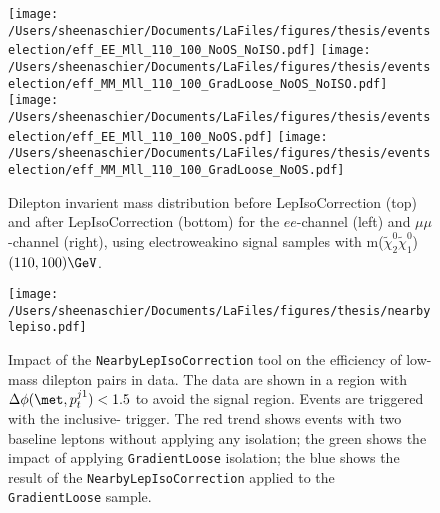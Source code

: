   \begin{figure}[tbp]
     \texttt{[image: /Users/sheenaschier/Documents/LaFiles/figures/thesis/eventselection/eff\_EE\_Mll\_110\_100\_NoOS\_NoISO.pdf]}
       \texttt{[image: /Users/sheenaschier/Documents/LaFiles/figures/thesis/eventselection/eff\_MM\_Mll\_110\_100\_GradLoose\_NoOS\_NoISO.pdf]}\\
     \texttt{[image: /Users/sheenaschier/Documents/LaFiles/figures/thesis/eventselection/eff\_EE\_Mll\_110\_100\_NoOS.pdf]}
     \texttt{[image: /Users/sheenaschier/Documents/LaFiles/figures/thesis/eventselection/eff\_MM\_Mll\_110\_100\_GradLoose\_NoOS.pdf]}\\
   \caption{Dilepton invarient mass distribution before LepIsoCorrection (top) and after LepIsoCorrection (bottom) for the $ee$-channel (left) and $\mu\mu$-channel (right), using electroweakino signal samples with m($\tilde\chi_2^0\tilde\chi_1^0$) $(110, 100)\GeV$.}
   \label{fig:EffMll_ISOCorr}
 \end{figure}
 \begin{figure}[tbp]
 \centering
  \texttt{[image: /Users/sheenaschier/Documents/LaFiles/figures/thesis/nearbylepiso.pdf]}
  \caption{Impact of the \texttt{NearbyLepIsoCorrection} tool on the efficiency of low-mass dilepton pairs in data.  The data are shown in a region with $\Delta\phi(\met, p_{t}^{j1})<1.5$ to avoid the signal region.  Events are triggered with the inclusive-\met{} trigger.  The red trend shows events with two baseline leptons without applying any isolation; the green shows the impact of applying \texttt{GradientLoose} isolation; the blue shows the result of the \texttt{NearbyLepIsoCorrection} applied to the \texttt{GradientLoose} sample.  %
  }
 \label{fig:nearbylepiso}
 \end{figure}
 

 
 


